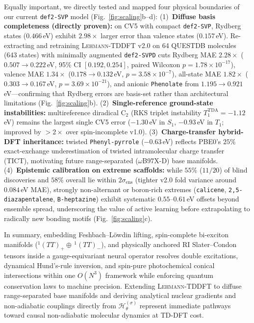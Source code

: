 \documentclass[10pt,twocolumn]{article}
\theoremstyle{natthm}
\newcommand{\leh}{\textsc{Lehmann-TDDFT}}
\newcommand{\Hlift}{\mathcal{H}_{\theta}^{(\sigma)}}
\begin{document}
Equally important, we directly tested and mapped four physical boundaries of our current \texttt{def2-SVP} model (Fig.~\ref{fig:scaling}b--d):
(1)~\textbf{Diffuse basis completeness (directly proven):} on CV5 with compact \texttt{def2-SVP}, Rydberg states ($0.466$\,eV) exhibit $2.98\times$ larger error than valence states ($0.157$\,eV). Re-extracting and retraining \leh{} v2.0 on 64 QUESTDB molecules (643 states) with minimally augmented \texttt{def2-SVPD}\cite{rappoport2010svpd} cuts Rydberg MAE \textbf{$2.28\times$} ($0.507\to 0.222$\,eV, 95\% CI $[0.192,0.254]$, paired Wilcoxon $p=1.78\times 10^{-17}$), valence MAE $1.34\times$ ($0.178\to 0.132$\,eV, $p=3.58\times 10^{-7}$), all-state MAE $1.82\times$ ($0.303\to 0.167$\,eV, $p=3.69\times 10^{-21}$), and anionic \texttt{Phenolate} from $1.195\to 0.921$\,eV---confirming that Rydberg errors are basis-set rather than architectural limitations (Fig.~\ref{fig:scaling}b).
(2)~\textbf{Single-reference ground-state instabilities:} multireference diradical $\mathrm{C}_2$ (RKS triplet instability $T_1^{\mathrm{TDA}}=-1.12$\,eV) remains the largest single CV5 error ($-1.30$\,eV in $S_1$, $-0.93$\,eV in $T_1$; improved by $>2\times$ over spin-incomplete v1.0).
(3)~\textbf{Charge-transfer hybrid-DFT inheritance:} twisted \texttt{Phenyl-pyrrole} ($-0.63$\,eV) reflects PBE0's $25\%$ exact-exchange underestimation of twisted intramolecular charge transfer (TICT), motivating future range-separated ($\omega$B97X-D) base manifolds.
(4)~\textbf{Epistemic calibration on extreme scaffolds:} while $55\%$ ($11/20$) of blind discoveries and $58\%$ overall lie within $2\sigma_{\mathrm{ens}}$ (tighter v2.0 fold variance around $0.084$\,eV MAE), strongly non-alternant or boron-rich extremes (\texttt{calicene}, \texttt{2,5-diazapentalene}, \texttt{B-heptazine}) exhibit systematic $0.55$--$0.61$\,eV offsets beyond ensemble spread, underscoring the value of active learning before extrapolating to radically new bonding motifs (Fig.~\ref{fig:scaling}c).

In summary, embedding Feshbach--L\"owdin lifting, spin-complete bi-exciton manifolds ($^1(TT)_+\oplus\,^1(TT)_-$), and physically anchored RI Slater--Condon tensors inside a gauge-equivariant neural operator resolves double excitations, dynamical Hund's-rule inversion, and spin-pure photochemical conical intersections within one $O(N^3)$ framework while enforcing quantum conservation laws to machine precision.
Extending \leh{} to diffuse range-separated base manifolds and deriving analytical nuclear gradients and non-adiabatic couplings directly from $\Hlift$ represent immediate pathways toward causal non-adiabatic molecular dynamics at TD-DFT cost.
\end{document}
